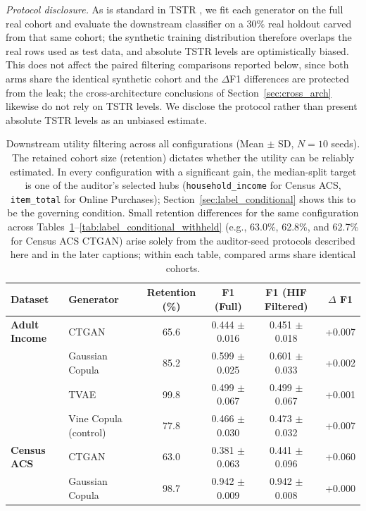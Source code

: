 \documentclass[pdflatex,sn-mathphys-num]{sn-jnl}
\theoremstyle{thmstyleone}%
\theoremstyle{thmstyletwo}%
\theoremstyle{thmstylethree}%
\begin{document}
\textit{Protocol disclosure.} As is standard in TSTR \cite{jordon2019pateggan}, we fit each generator on the full real cohort and evaluate the downstream classifier on a $30\%$ real holdout carved from that same cohort; the synthetic training distribution therefore overlaps the real rows used as test data, and absolute TSTR levels are optimistically biased. This does not affect the paired filtering comparisons reported below, since both arms share the identical synthetic cohort and the $\Delta$F1 differences are protected from the leak; the cross-architecture conclusions of Section~\ref{sec:cross_arch} likewise do not rely on TSTR levels. We disclose the protocol rather than present absolute TSTR levels as an unbiased estimate.

\begin{table}[htbp]
\centering
\caption{Downstream utility filtering across all configurations (Mean $\pm$ SD, $N=10$ seeds). The retained cohort size (retention) dictates whether the utility can be reliably estimated. In every configuration with a significant gain, the median-split target is one of the auditor's selected hubs (\texttt{household\_income} for Census ACS, \texttt{item\_total} for Online Purchases); Section~\ref{sec:label_conditional} shows this to be the governing condition. Small retention differences for the same configuration across Tables~\ref{tab:filtering}--\ref{tab:label_conditional_withheld} (e.g., 63.0\%, 62.8\%, and 62.7\% for Census ACS CTGAN) arise solely from the auditor-seed protocols described here and in the later captions; within each table, compared arms share identical cohorts.}
\label{tab:filtering}
\footnotesize
\setlength{\tabcolsep}{4pt}
\begin{tabular}{@{}llcccc@{}}
\toprule
Dataset & Generator & Retention (\%) & F1 (Full) & F1 (HIF Filtered) & $\Delta$ F1 \\
\midrule
\textbf{Adult Income} & CTGAN & 65.6 & 0.444 $\pm$ 0.016 & 0.451 $\pm$ 0.018 & +0.007 \\
 & Gaussian Copula & 85.2 & 0.599 $\pm$ 0.025 & 0.601 $\pm$ 0.033 & +0.002 \\
 & TVAE & 99.8 & 0.499 $\pm$ 0.067 & 0.499 $\pm$ 0.067 & +0.001 \\
 & Vine Copula (control) &77.8 & 0.466 $\pm$ 0.030 & 0.473 $\pm$ 0.032 & +0.007 \\
\midrule
\textbf{Census ACS} & CTGAN & 63.0 & 0.381 $\pm$ 0.063 & 0.441 $\pm$ 0.096 & +0.060 \\
 & Gaussian Copula & 98.7 & 0.942 $\pm$ 0.009 & 0.942 $\pm$ 0.008 & +0.000 \\

\end{tabular}
\end{table}
\end{document}
